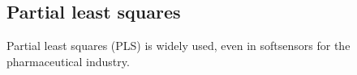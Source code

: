 \afterpage{\clearpage}
\subsection{Partial least squares}

Partial least squares (PLS) is widely used,
even in softsensors for the pharmaceutical industry\cite{Roggo2007}.
